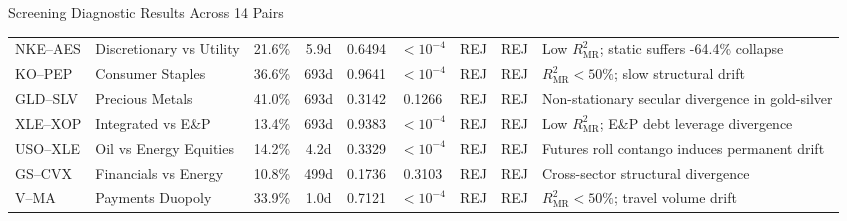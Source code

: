 \documentclass[10pt, aspectratio=169]{beamer}
\begin{document}
\begin{frame}{Screening Diagnostic Results Across 14 Pairs}
\begin{table}
\begin{tabular}{@{}llccccccl@{}}
      NKE--AES & Discretionary vs Utility & 21.6\% & 5.9d & 0.6494 & $<10^{-4}$ & \textcolor{negred}{REJ} & \textcolor{negred}{REJ} & Low $R^2_{\text{MR}}$; static suffers -64.4\% collapse \\
      KO--PEP & Consumer Staples & 36.6\% & 693d & 0.9641 & $<10^{-4}$ & \textcolor{negred}{REJ} & \textcolor{negred}{REJ} & $R^2_{\text{MR}} < 50\%$; slow structural drift \\
      GLD--SLV & Precious Metals & 41.0\% & 693d & 0.3142 & 0.1266 & \textcolor{negred}{REJ} & \textcolor{negred}{REJ} & Non-stationary secular divergence in gold-silver \\
      XLE--XOP & Integrated vs E\&P & 13.4\% & 693d & 0.9383 & $<10^{-4}$ & \textcolor{negred}{REJ} & \textcolor{negred}{REJ} & Low $R^2_{\text{MR}}$; E\&P debt leverage divergence \\
      USO--XLE & Oil vs Energy Equities & 14.2\% & 4.2d & 0.3329 & $<10^{-4}$ & \textcolor{negred}{REJ} & \textcolor{negred}{REJ} & Futures roll contango induces permanent drift \\
      GS--CVX & Financials vs Energy & 10.8\% & 499d & 0.1736 & 0.3103 & \textcolor{negred}{REJ} & \textcolor{negred}{REJ} & Cross-sector structural divergence \\
      V--MA & Payments Duopoly & 33.9\% & 1.0d & 0.7121 & $<10^{-4}$ & \textcolor{negred}{REJ} & \textcolor{negred}{REJ} & $R^2_{\text{MR}} < 50\%$; travel volume drift \\
      \bottomrule
    \end{tabular}
  \end{table}
\end{frame}
\end{document}

